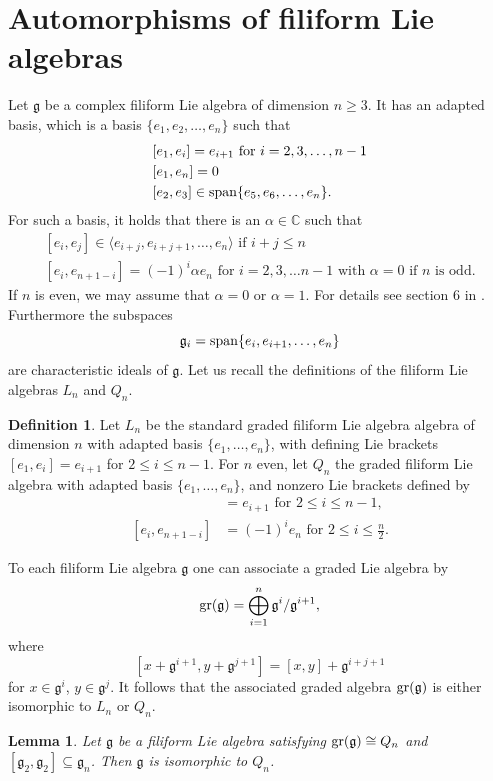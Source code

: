 \documentclass[12pt]{amsart}
\newtheorem{lem}[thm]{Lemma}
\theoremstyle{definition}
\newtheorem{defi}[thm]{Definition}
\theoremstyle{remark}
\newcommand{\C}{\mathbb{C}}
\newcommand{\Lg}{\mathfrak{g}}
\newcommand{\al}{\alpha}
\begin{document}
\section{Automorphisms of filiform Lie algebras}

Let $\Lg$ be a complex filiform Lie algebra of dimension $n\ge 3$. It has an adapted basis, which is a basis 
$\{e_1,e_2, \ldots ,e_n\}$ such that
\[
\begin{array}{l}
{[e_1,e_i]}= e_{i+1} \mbox{ for } i= 2,3,\ldots , n-1\\[1mm]
{[e_1,e_n]}= 0 \\[1mm]
{[e_2,e_3]} \in {\rm span}\{ e_5,e_6, \ldots , e_n \}.
\end{array}
\]
For such a basis, it holds that  there is an $\alpha\in \C$ such that
\[
\begin{array}{l}
{[e_i,e_j]}\in \langle e_{i+j}, e_{i+j+1}, \ldots, e_n\rangle \mbox{ if  } i+j \leq n\\[1mm]
{[e_i,e_{n+1-i}]} = (-1)^i \alpha e_n \mbox{ for }i =2,3,\ldots n-1\mbox{ with }\alpha =0 \mbox{ if $n$ is odd.}  
\end{array} 
\]
If $n$ is even, we may assume that $\al=0$ or $\al=1$. For details see section $6$ in \cite{BU82}. Furthermore
the subspaces
\[
\Lg_i= {\rm span} \{ e_i, e_{i+1}, \ldots, e_n\}
\]
are characteristic ideals of $\Lg$. Let us recall the definitions of the filiform Lie algebras $L_n$ and $Q_n$.
\begin{defi}
Let $L_n$ be the standard graded filiform Lie algebra algebra of dimension $n$ with adapted basis $\{e_1,\ldots ,e_n\}$, with
defining Lie brackets $[e_1,e_i]=e_{i+1}$ for $2\le i\le n-1$. 
For $n$ even, let $Q_n$ the graded filiform Lie algebra with adapted basis $\{e_1,\ldots ,e_n\}$, and nonzero Lie brackets defined by
\begin{align*}
[e_1,e_i] & = e_{i+1} \text{ for } 2\le i\le n-1, \\[0.1cm]
[e_i, e_{n+1-i}]  & =(-1)^i e_n \text{ for } 2\le i\le \frac{n}{2}.
\end{align*}
\end{defi}
To each filiform Lie algebra $\Lg$ one can associate a graded Lie algebra by
\[
{\rm gr}(\Lg)=\bigoplus_{i=1}^n \Lg^i/\Lg^{i+1},
\]
where
\[
[x+\Lg^{i+1},y+\Lg^{j+1}]=[x,y]+\Lg^{i+j+1}
\]  
for $x\in \Lg^i$, $y\in \Lg^j$. %
It follows that the associated graded algebra ${\rm gr}(\Lg)$ is either isomorphic to $L_n$ or $Q_n$.

\begin{lem}\label{6.2}
Let $\Lg$ be a filiform Lie algebra satisfying ${\rm gr}(\Lg)\cong Q_n$ and $[\Lg_2,\Lg_2]\subseteq \Lg_n$.
Then $\Lg$ is isomorphic to $Q_n$.  
\end{lem}
\end{document}
